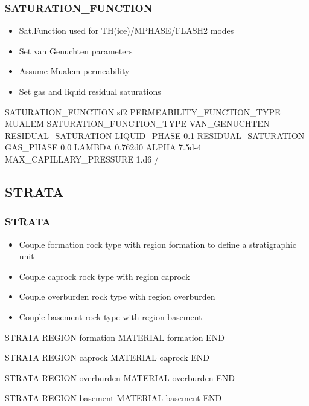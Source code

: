 \documentclass{beamer}
\newcommand\greencomment[1]{{{\color{green} #1}}}
\begin{document}
\begin{frame}[fragile]\frametitle{SATURATION\_FUNCTION}

\begin{itemize}
\item Sat.Function used for TH(ice)/MPHASE/FLASH2 modes	
\item Set van Genuchten parameters
\item Assume Mualem permeability
\item Set gas and liquid residual saturations
\end{itemize}

\begin{semiverbatim}
SATURATION_FUNCTION sf2
  PERMEABILITY_FUNCTION_TYPE MUALEM
  SATURATION_FUNCTION_TYPE VAN_GENUCHTEN
  RESIDUAL_SATURATION LIQUID_PHASE 0.1
  RESIDUAL_SATURATION GAS_PHASE 0.0
  LAMBDA 0.762d0
  ALPHA 7.5d-4
  MAX_CAPILLARY_PRESSURE 1.d6
/
\end{semiverbatim}

\end{frame}

\subsection{STRATA}

\begin{frame}\frametitle{STRATA}

\begin{itemize}
\item Couple \greencomment{formation} rock type with region \greencomment{formation} to define a stratigraphic unit
\item Couple \greencomment{caprock} rock type with region \greencomment{caprock}
\item Couple \greencomment{overburden} rock type with region \greencomment{overburden}
\item Couple \greencomment{basement} rock type with region \greencomment{basement}
\end{itemize}

\begin{semiverbatim}

STRATA
  REGION formation
  MATERIAL formation
END

STRATA
  REGION caprock
  MATERIAL caprock
END

STRATA
  REGION overburden
  MATERIAL overburden
END

STRATA
  REGION basement
  MATERIAL basement
END


\end{semiverbatim}

\end{frame}
\end{document}
